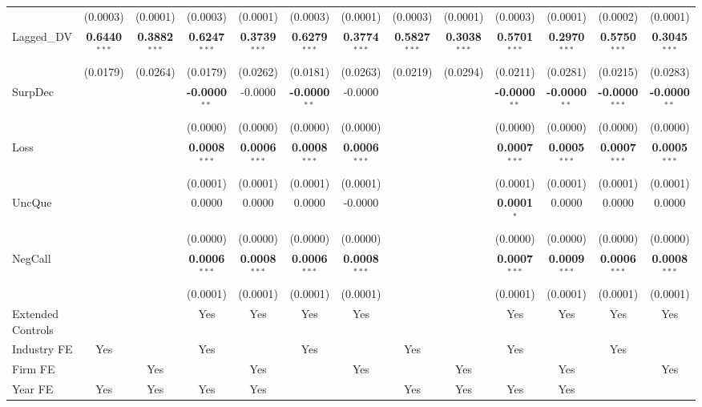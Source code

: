 \begin{landscape}
\begin{table}[H]
\begin{tabular}{lcccccccccccc}
 & (0.0003) & (0.0001) & (0.0003) & (0.0001) & (0.0003) & (0.0001) & (0.0003) & (0.0001) & (0.0003) & (0.0001) & (0.0002) & (0.0001) \\
Lagged\_DV & \textbf{0.6440}$^{***}$ & \textbf{0.3882}$^{***}$ & \textbf{0.6247}$^{***}$ & \textbf{0.3739}$^{***}$ & \textbf{0.6279}$^{***}$ & \textbf{0.3774}$^{***}$ & \textbf{0.5827}$^{***}$ & \textbf{0.3038}$^{***}$ & \textbf{0.5701}$^{***}$ & \textbf{0.2970}$^{***}$ & \textbf{0.5750}$^{***}$ & \textbf{0.3045}$^{***}$ \\
 & (0.0179) & (0.0264) & (0.0179) & (0.0262) & (0.0181) & (0.0263) & (0.0219) & (0.0294) & (0.0211) & (0.0281) & (0.0215) & (0.0283) \\
SurpDec &  &  & \textbf{-0.0000}$^{**}$ & -0.0000 & \textbf{-0.0000}$^{**}$ & -0.0000 &  &  & \textbf{-0.0000}$^{**}$ & \textbf{-0.0000}$^{**}$ & \textbf{-0.0000}$^{***}$ & \textbf{-0.0000}$^{**}$ \\
 &  &  & (0.0000) & (0.0000) & (0.0000) & (0.0000) &  &  & (0.0000) & (0.0000) & (0.0000) & (0.0000) \\
Loss &  &  & \textbf{0.0008}$^{***}$ & \textbf{0.0006}$^{***}$ & \textbf{0.0008}$^{***}$ & \textbf{0.0006}$^{***}$ &  &  & \textbf{0.0007}$^{***}$ & \textbf{0.0005}$^{***}$ & \textbf{0.0007}$^{***}$ & \textbf{0.0005}$^{***}$ \\
 &  &  & (0.0001) & (0.0001) & (0.0001) & (0.0001) &  &  & (0.0001) & (0.0001) & (0.0001) & (0.0001) \\
UncQue &  &  & 0.0000 & 0.0000 & 0.0000 & -0.0000 &  &  & \textbf{0.0001}$^{*}$ & 0.0000 & 0.0000 & 0.0000 \\
 &  &  & (0.0000) & (0.0000) & (0.0000) & (0.0000) &  &  & (0.0000) & (0.0000) & (0.0000) & (0.0000) \\
NegCall &  &  & \textbf{0.0006}$^{***}$ & \textbf{0.0008}$^{***}$ & \textbf{0.0006}$^{***}$ & \textbf{0.0008}$^{***}$ &  &  & \textbf{0.0007}$^{***}$ & \textbf{0.0009}$^{***}$ & \textbf{0.0006}$^{***}$ & \textbf{0.0008}$^{***}$ \\
 &  &  & (0.0001) & (0.0001) & (0.0001) & (0.0001) &  &  & (0.0001) & (0.0001) & (0.0001) & (0.0001) \\
\midrule
Extended Controls &  &  & Yes & Yes & Yes & Yes &  &  & Yes & Yes & Yes & Yes \\
Industry FE & Yes &  & Yes &  & Yes &  & Yes &  & Yes &  & Yes &  \\
Firm FE &  & Yes &  & Yes &  & Yes &  & Yes &  & Yes &  & Yes \\
Year FE & Yes & Yes & Yes & Yes &  &  & Yes & Yes & Yes & Yes &  &  \\

\end{tabular}
\end{table}
\end{landscape}

